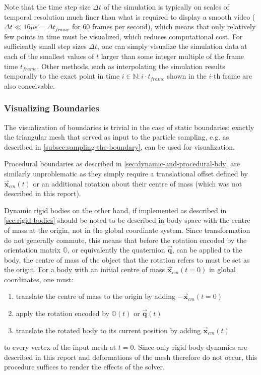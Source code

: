 \documentclass[oneside, a4paper]{book}
\newcommand\vek[1]{\vec{\bm{#1}}}
\newcommand\br[1]{\left(#1\right)}
\begin{document}
  Note that the time step size $\Delta t$ of the simulation is typically on scales of temporal resolution much finer than what is required to display a smooth video ($\Delta t \ll 16\si{\mu\second} = \Delta t_{frame}$ for 60 frames per second), which means that only relatively few points in time must be visualized, which reduces computational cost. For sufficiently small step sizes $\Delta t$, one can simply visualize the simulation data at each of the smallest values of $t$ larger than some integer multiple of the frame time $t_{frame}$. Other methods, such as interpolating the simulation results temporally to the exact point in time $i\in\mathds{N}: i\cdot t_{frame}$ shown in the $i$-th frame are also conceivable.

  \subsubsection{Visualizing Boundaries}
  The visualization of boundaries is trivial in the case of static boundaries: exactly the triangular mesh that served as input to the particle sampling, e.g. as described in \autoref{subsec:sampling-the-boundary}, can be used for visualization.

  Procedural boundaries as described in \autoref{sec:dynamic-and-procedural-bdy} are similarly unproblematic as they simply require a translational offset defined by $\vek{x}_{cm}\br{t}$ or an additional rotation about their centre of mass (which was not described in this report). 

  Dynamic rigid bodies on the other hand, if implemented as described in \autoref{sec:rigid-bodies} should be noted to be described in body space with the centre of mass at the origin, not in the global coordinate system. Since transformation do not generally commute, this means that before the rotation encoded by the orientation matrix $\mathds{O}$, or equivalently the quaternion $\vek{q}$, can be applied to the body, the centre of mass of the object that the rotation refers to must be set as the origin. For a body with an initial centre of mass $\vek{x}_{cm}\br{t=0}$ in global coordinates, one must:
  \begin{enumerate}
    \item translate the centre of mass to the origin by adding $-\vek{x}_{cm}\br{t=0}$
    \item apply the rotation encoded by $\mathds{O}\br{t}$ or $\vek{q}\br{t}$
    \item translate the rotated body to its current position by adding $\vek{x}_{cm}\br{t}$
  \end{enumerate}
  to every vertex of the input mesh at $t=0$. Since only rigid body dynamics are described in this report and deformations of the mesh therefore do not occur, this procedure suffices to render the effects of the solver.
\end{document}
